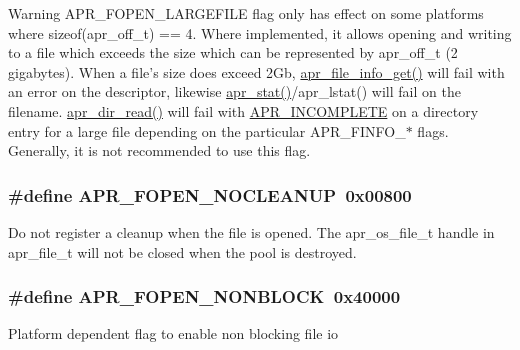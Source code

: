 \begin{DoxyWarning}{Warning}
A\-P\-R\-\_\-\-F\-O\-P\-E\-N\-\_\-\-L\-A\-R\-G\-E\-F\-I\-L\-E flag only has effect on some platforms where sizeof(apr\-\_\-off\-\_\-t) == 4. Where implemented, it allows opening and writing to a file which exceeds the size which can be represented by apr\-\_\-off\-\_\-t (2 gigabytes). When a file's size does exceed 2\-Gb, \hyperlink{group__apr__file__io_ga39be7fe05d0dda4a28f4358b61a44ac8}{apr\-\_\-file\-\_\-info\-\_\-get()} will fail with an error on the descriptor, likewise \hyperlink{group__apr__file__stat_gafb0f4a4fa4545c155e20ddd8f2001c1a}{apr\-\_\-stat()}/apr\-\_\-lstat() will fail on the filename. \hyperlink{group__apr__dir_ga3e4ee253e0c712160bee10bfb9c8e4a8}{apr\-\_\-dir\-\_\-read()} will fail with \hyperlink{group___a_p_r___error_ga64dff43b83bcefd3f3c751be6b864ca1}{A\-P\-R\-\_\-\-I\-N\-C\-O\-M\-P\-L\-E\-T\-E} on a directory entry for a large file depending on the particular A\-P\-R\-\_\-\-F\-I\-N\-F\-O\-\_\-$\ast$ flags. Generally, it is not recommended to use this flag. 
\end{DoxyWarning}
\hypertarget{group__apr__file__open__flags_ga3fc9b5a7791d9f462997cd29de67eb80}{
\subsubsection[{A\-P\-R\-\_\-\-F\-O\-P\-E\-N\-\_\-\-N\-O\-C\-L\-E\-A\-N\-U\-P}]{\setlength{\rightskip}{0pt plus 5cm}\#define A\-P\-R\-\_\-\-F\-O\-P\-E\-N\-\_\-\-N\-O\-C\-L\-E\-A\-N\-U\-P~0x00800}}\label{group__apr__file__open__flags_ga3fc9b5a7791d9f462997cd29de67eb80}
Do not register a cleanup when the file is opened. The apr\-\_\-os\-\_\-file\-\_\-t handle in apr\-\_\-file\-\_\-t will not be closed when the pool is destroyed. \hypertarget{group__apr__file__open__flags_ga31e4d14068147e43e1778bcf975dda62}{
\subsubsection[{A\-P\-R\-\_\-\-F\-O\-P\-E\-N\-\_\-\-N\-O\-N\-B\-L\-O\-C\-K}]{\setlength{\rightskip}{0pt plus 5cm}\#define A\-P\-R\-\_\-\-F\-O\-P\-E\-N\-\_\-\-N\-O\-N\-B\-L\-O\-C\-K~0x40000}}\label{group__apr__file__open__flags_ga31e4d14068147e43e1778bcf975dda62}
Platform dependent flag to enable non blocking file io

